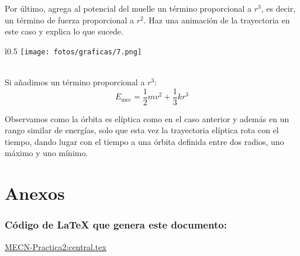 \documentclass[11pt]{article}
\newcommand{\laputa}[1]{\begin{note}{#1}{}\end{note}}
\begin{document}
        \clearpage
        \laputa{Por último, agrega al potencial del muelle un término proporcional a $r^3$, es decir, un término de fuerza proporcional a $r^2$. Haz una animación de la trayectoria en este caso y explica lo que sucede.}

            \begin{wrapfigure}[11]{l}{0.5\textwidth}
                \vspace{-0.4cm}
                \centering
                \texttt{[image: fotos/graficas/7.png]}
            \end{wrapfigure}
            
            \hspace{0cm}\\\noindent Si añadimos un término proporcional a $r^3$:
            \[E_\text{mec}=\dfrac12 mv^2+\dfrac13 kr^3\]

            \noindent Observamos como la órbita es elíptica como en el caso anterior y además en un rango similar de energías, solo que esta vez la trayectoria elíptica rota con el tiempo, dando lugar con el tiempo a una órbita definida entre dos radios, uno máximo y uno mínimo.
    \section{Anexos}
        \subsubsection*{Código de LaTeX que genera este documento:}
            \href{https://www.overleaf.com/read/trvqgmfvrzfv#d29911}{MECN-Practica2:central.tex}
\end{document}
